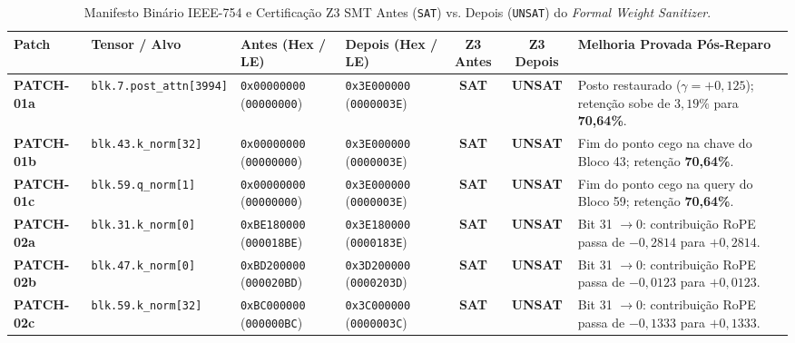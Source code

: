 \documentclass[11pt,a4paper]{article}
\theoremstyle{definition}
\begin{document}
\begin{table}[H]
\centering
\caption{Manifesto Binário IEEE-754 e Certificação Z3 SMT Antes (\texttt{SAT}) vs. Depois (\texttt{UNSAT}) do \textit{Formal Weight Sanitizer}.}
\label{tab:sanitizer_patches}
\footnotesize
\setlength{\tabcolsep}{3.8pt}
\renewcommand{\arraystretch}{1.24}
\begin{tabularx}{\textwidth}{l l l l c c X}
\toprule
\textbf{Patch} & \textbf{Tensor / Alvo} & \textbf{Antes (Hex / LE)} & \textbf{Depois (Hex / LE)} & \textbf{Z3 Antes} & \textbf{Z3 Depois} & \textbf{Melhoria Provada Pós-Reparo} \\
\midrule
\textbf{PATCH-01a} & \texttt{blk.7.post\_attn[3994]} & \texttt{0x00000000} (\texttt{00000000}) & \texttt{0x3E000000} (\texttt{0000003E}) & \textcolor{flawred}{\textbf{SAT}} & \textcolor{safegreen}{\textbf{UNSAT}} & Posto restaurado ($\gamma = +0{,}125$); retenção sobe de $3{,}19\%$ para \textbf{70,64\%}. \\
\textbf{PATCH-01b} & \texttt{blk.43.k\_norm[32]} & \texttt{0x00000000} (\texttt{00000000}) & \texttt{0x3E000000} (\texttt{0000003E}) & \textcolor{flawred}{\textbf{SAT}} & \textcolor{safegreen}{\textbf{UNSAT}} & Fim do ponto cego na chave do Bloco 43; retenção \textbf{70,64\%}. \\
\textbf{PATCH-01c} & \texttt{blk.59.q\_norm[1]} & \texttt{0x00000000} (\texttt{00000000}) & \texttt{0x3E000000} (\texttt{0000003E}) & \textcolor{flawred}{\textbf{SAT}} & \textcolor{safegreen}{\textbf{UNSAT}} & Fim do ponto cego na query do Bloco 59; retenção \textbf{70,64\%}. \\
\midrule
\textbf{PATCH-02a} & \texttt{blk.31.k\_norm[0]} & \texttt{0xBE180000} (\texttt{000018BE}) & \texttt{0x3E180000} (\texttt{0000183E}) & \textcolor{flawred}{\textbf{SAT}} & \textcolor{safegreen}{\textbf{UNSAT}} & Bit 31 $\to 0$: contribuição RoPE passa de $-0{,}2814$ para \textbf{$+0{,}2814$}. \\
\textbf{PATCH-02b} & \texttt{blk.47.k\_norm[0]} & \texttt{0xBD200000} (\texttt{000020BD}) & \texttt{0x3D200000} (\texttt{0000203D}) & \textcolor{flawred}{\textbf{SAT}} & \textcolor{safegreen}{\textbf{UNSAT}} & Bit 31 $\to 0$: contribuição RoPE passa de $-0{,}0123$ para \textbf{$+0{,}0123$}. \\
\textbf{PATCH-02c} & \texttt{blk.59.k\_norm[32]} & \texttt{0xBC000000} (\texttt{000000BC}) & \texttt{0x3C000000} (\texttt{0000003C}) & \textcolor{flawred}{\textbf{SAT}} & \textcolor{safegreen}{\textbf{UNSAT}} & Bit 31 $\to 0$: contribuição RoPE passa de $-0{,}1333$ para \textbf{$+0{,}1333$}. \\

\end{tabularx}
\end{table}
\end{document}
